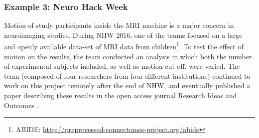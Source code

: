 \subsubsection*{Example 3: Neuro Hack Week}
Motion of study participants inside the MRI machine is a major concern in neuroimaging studies.
During NHW 2016, one of the teams focused on a large and openly available data-set of MRI data from children\footnote{ABIDE: \url{http://preprocessed-connectomes-project.org/abide}}.
To test the effect of motion on the results, the team conducted an analysis in which both the number of experimental subjects included, as well as motion cut-off, were varied.
The team (composed of four researchers from four different institutions) continued to work on this project remotely after the end of NHW, and eventually published a paper describing these results in the open access journal Research Ideas and Outcomes \cite{leonard2017}.
